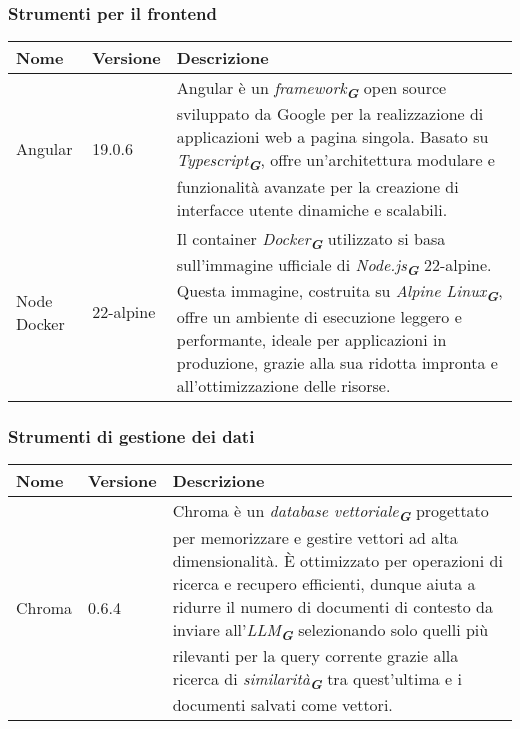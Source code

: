 \subsubsection{Strumenti per il frontend}
\label{subsec:strumenti_frontend}
\begin{table}[h!]
    \centering
    \renewcommand{\arraystretch}{1.6} %
    \begin{tabularx}{\textwidth}{|p{2cm}|p{2cm}|X|} \hline
    \rowcolor[HTML]{FFD700} 
    \textbf{Nome} & \textbf{Versione} & \textbf{Descrizione} \\ \hline
    Angular & 19.0.6 & Angular è un \emph{framework}\textsubscript{\textbf{\textit{G}}} open source sviluppato da Google per la realizzazione di applicazioni web a pagina singola. 
    Basato su \emph{Typescript}\textsubscript{\textbf{\textit{G}}}, offre un'architettura modulare e funzionalità avanzate per la creazione di interfacce utente dinamiche e scalabili. \\ \hline
    Node Docker & 22-alpine & Il container \emph{Docker}\textsubscript{\textbf{\textit{G}}} utilizzato si basa sull'immagine ufficiale di \emph{Node.js}\textsubscript{\textbf{\textit{G}}} 22-alpine. 
    Questa immagine, costruita su \emph{Alpine Linux}\textsubscript{\textbf{\textit{G}}}, offre un ambiente di esecuzione leggero e performante, ideale per applicazioni in produzione, 
    grazie alla sua ridotta impronta e all'ottimizzazione delle risorse. \\ \hline
\end{tabularx}
\end{table}

\subsubsection{Strumenti di gestione dei dati}
\label{subsec:strumenti_gestione_dati}
\begin{table}[h!]
    \centering
    \renewcommand{\arraystretch}{1.6} %
    \begin{tabularx}{\textwidth}{|p{2cm}|p{2cm}|X|} \hline
    \rowcolor[HTML]{FFD700} 
    \textbf{Nome} & \textbf{Versione} & \textbf{Descrizione} \\ \hline
    Chroma & 0.6.4 & Chroma è un \emph{database vettoriale}\textsubscript{\textbf{\textit{G}}} progettato per memorizzare e
                    gestire vettori ad alta dimensionalità. 
                    È ottimizzato per operazioni di ricerca e recupero efficienti, dunque aiuta a ridurre il numero di documenti
                    di contesto da inviare all'\emph{LLM}\textsubscript{\textbf{\textit{G}}} selezionando solo quelli più rilevanti
                    per la query corrente grazie alla ricerca di \emph{similarità}\textsubscript{\textbf{\textit{G}}} tra 
                    quest'ultima e i documenti salvati come vettori. \\ \hline
    \end{tabularx}
\end{table}

